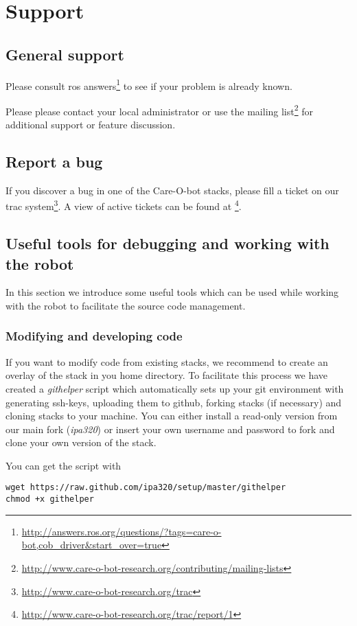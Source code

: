 \chapter{Support}\label{chap:support}
\section{General support}
Please consult ros answers\footnote{\url{http://answers.ros.org/questions/?tags=care-o-bot,cob_driver&start_over=true}} to see if your problem is already known. 

Please please contact your local administrator or use the mailing list\footnote{\url{http://www.care-o-bot-research.org/contributing/mailing-lists}} for additional support or feature discussion.

\section{Report a bug}
If you discover a bug in one of the Care-O-bot stacks, please fill a ticket on our trac system\footnote{\url{http://www.care-o-bot-research.org/trac}}. A view of active tickets can be found at \footnote{\url{http://www.care-o-bot-research.org/trac/report/1}}.


\section{Useful tools for debugging and working with the robot}
In this section we introduce some useful tools which can be used while working with the robot to facilitate the source code management.

\subsection{Modifying and developing code}
If you want to modify code from existing stacks, we recommend to create an overlay of the stack in you home directory. To facilitate this process we have created a \textit{githelper} script which automatically sets up your git environment with generating ssh-keys, uploading them to github, forking stacks (if necessary) and cloning stacks to your machine. You can either install a read-only version from our main fork (\textit{ipa320}) or insert your own username and password to fork and clone your own version of the stack. 

You can get the script with
\begin{lstlisting}
wget https://raw.github.com/ipa320/setup/master/githelper
chmod +x githelper
\end{lstlisting}

